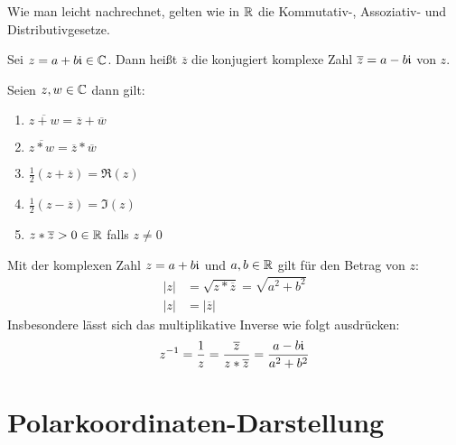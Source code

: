 \bemerkung
Wie man leicht nachrechnet, gelten wie in $\mathbb{R}$ die Kommutativ-, Assoziativ- und Distributivgesetze.

Sei $z=a+b\mathfrak{i}\in\mathbb{C}$. Dann heißt $\overline z$ die konjugiert komplexe Zahl $\overline z=a-b\mathfrak{i}$ von $z$.

Seien $z,w\in\mathbb{C}$ dann gilt:
\begin{enumerate}
  \item $\overline{z+w}=\overline z+\overline w$
  \item $\overline{z* w}=\overline z * \overline w$
  \item $\frac 1 2 (z+\overline z)=\Re(z)$
  \item $\frac 1 2 (z-\overline z)=\Im(z)$
  \item $z* \overline z > 0 \in\mathbb{R}$ falls $z\neq0$
\end{enumerate}

Mit der komplexen Zahl $z=a+b\mathfrak{i}$ und $a,b\in\mathbb{R}$ gilt für den Betrag von $z$:
\begin{align*}
  |z|&=\sqrt{z*\overline z}=\sqrt{a^2+b^2}\\
  |z|&=|\overline z|
\end{align*}
Insbesondere lässt sich das multiplikative Inverse wie folgt ausdrücken:
\begin{equation*}
  z^{-1}=\frac 1 z=\frac{\overline z}{z*\overline z}=\frac{a-b\mathfrak{i}}{a^2+b^2}
\end{equation*}

\section{Polarkoordinaten-Darstellung}

